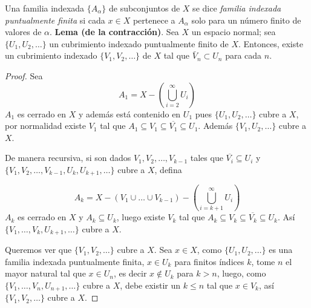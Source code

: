 
\item Una familia indexada \( \{ A_{\alpha} \} \) de subconjuntos de \( X \) se dice \textit{familia indexada puntualmente finita} si cada \( x \in X \) pertenece a \( A_{\alpha} \) solo para un número finito de valores de \( \alpha \).  
    \textbf{Lema (de la contracción)}. Sea \( X \) un espacio normal; sea \( \{ U_1, U_2, \dots \} \) un cubrimiento indexado puntualmente finito de \( X \). Entonces, existe un cubrimiento indexado \( \{ V_1, V_2, \dots \} \) de \( X \) tal que \( \bar{V}_n \subset U_n \) para cada \( n \).

\begin{proof}
    Sea 
    \[
    A_1 = X - \left(\bigcup_{i=2}^{\infty} U_i \right) 
    \]
    $A_1$ es cerrado en $X$ y además está contenido en $U_1$ pues $\{U_1,U_2,\ldots\}$ cubre a $X$, por normalidad existe $V_1$ tal que $A_1 \subseteq V_1 \subseteq \overline{V_1} \subseteq U_1$. Además $\{V_1,U_2,\ldots\}$ cubre a $X$.

    De manera recursiva, si son dados $V_1,V_2, \ldots, V_{k-1}$ tales que $\overline{V_i}\subseteq U_i$ y $\{V_1,V_2,\ldots,V_{k-1},U_k,U_{k+1},\ldots\}$ cubre a $X$, defina

    \[
    A_k = X- (V_1 \cup \ldots \cup V_{k-1}) - \left(\bigcup_{i=k+1}^{\infty} U_i \right)
    \]
    $A_k$ es cerrado en $X$ y $A_k \subseteq U_k$, luego existe $V_k$ tal que $A_k \subseteq V_k \subseteq \overline{V_k} \subseteq U_k$. Así $\{V_1,\ldots,V_k,U_{k+1},\ldots\}$ cubre a $X$.

    Queremos ver que $\{V_1,V_2,\ldots\}$ cubre a $X$. Sea $x \in X$, como $\{U_1, U_2, \ldots\}$ es una familia indexada puntualmente finita, $x \in U_k$ para finitos índices $k$, tome $n$ el mayor natural tal que $x \in U_n$, es decir $x \notin U_k$ para $k > n$, luego, como $\{V_1,\ldots,V_n,U_{n+1},\ldots\}$ cubre a $X$, debe existir un $k \leq n$ tal que $x \in V_k$, así $\{V_1,V_2,\ldots\}$ cubre a $X$.
\end{proof}